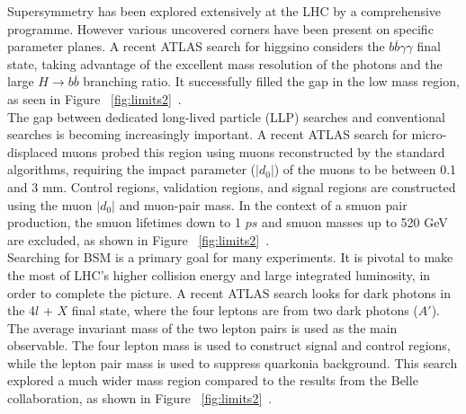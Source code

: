 \documentclass{moriond}
\begin{document}
Supersymmetry has been explored extensively at the LHC by a comprehensive
programme. However various uncovered corners have been present on specific
parameter planes. A recent ATLAS search for higgsino considers the
$b\overline{b}\gamma\gamma$ final state, taking advantage of the excellent mass
resolution of the photons and the large $H\rightarrow b\overline{b}$ branching
ratio. It successfully filled the gap in the low mass region, as seen in Figure
~\ref{fig:limits2}~\cite{bbyy}.\\

The gap between dedicated long-lived particle (LLP) searches and conventional
searches is becoming increasingly important. A recent ATLAS search for
micro-displaced muons probed this region using muons reconstructed by the
standard algorithms, requiring the impact parameter ($|d_{0}|$) of the muons to
be between 0.1 and 3 mm. Control regions, validation regions, and signal
regions are constructed using the muon $|d_{0}|$ and muon-pair mass. In the
context of a smuon pair production, the smuon lifetimes down to 1 $ps$ and
smuon masses up to 520 GeV are excluded, as shown in Figure
~\ref{fig:limits2}~\cite{micro}.\\   

Searching for BSM is a primary goal for many experiments. It is pivotal to make
the most of LHC's higher collision energy and large integrated luminosity, in
order to complete the picture. A recent ATLAS search looks for dark photons in
the 4$l$ + $X$ final state, where the four leptons are from two dark photons
($A'$). The average invariant mass of the two lepton pairs is used as the main
observable. The four lepton mass is used to construct signal and control
regions, while the lepton pair mass is used to suppress quarkonia background.
This search explored a much wider mass region compared to the results from the
Belle collaboration, as shown in Figure
~\ref{fig:limits2}~\cite{dark}.\\ 
\end{document}
